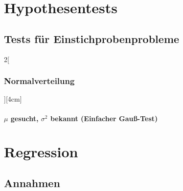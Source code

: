 \documentclass[8pt]{extarticle}
\begin{document}
  



\section{Hypothesentests}

\subsection{Tests für Einstichprobenprobleme}

\begin{multicols}{2}[\subsubsection{Normalverteilung}][4cm]

  \paragraph{ $\mu$ gesucht, $\sigma^2 $ bekannt (Einfacher Gauß-Test)}
  


\end{multicols}





\section{Regression}

\subsection{Annahmen}
\end{document}
